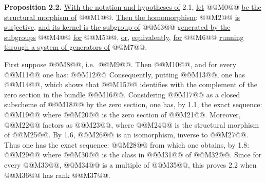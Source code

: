 
\textbf{Proposition 2.2.} \uline{With the notation and hypotheses of} 2.1, \uline{let} @@M0@@ \uline{be the structural morphism of} @@M1@@. \uline{Then the homomorphism}:
@@M2@@
\uline{is surjective}, \uline{and its kernel is the subgroup of} @@M3@@ \uline{generated by the subgroups} @@M4@@ \uline{for} @@M5@@, \uline{or}, \uline{equivalently}, \uline{for} @@M6@@ \uline{running through a system of generators of} @@M7@@.

First suppose @@M8@@, i.e.\ @@M9@@. Then @@M10@@, and for every @@M11@@ one has:
@@M12@@
Consequently, putting @@M13@@, one has @@M14@@, which shows that @@M15@@ identifies with the complement of the zero section in the bundle @@M16@@. Considering @@M17@@ as a closed subscheme of @@M18@@ by the zero section, one has, by 1.1, the exact sequence:
@@M19@@
where @@M20@@ is the zero section of @@M21@@. Moreover, @@M22@@ factors as @@M23@@, where @@M24@@ is the structural morphism of @@M25@@. By 1.6, @@M26@@ is an isomorphism, inverse to @@M27@@. Thus one has the exact sequence:
@@M28@@
from which one obtains, by 1.8:
@@M29@@
where @@M30@@ is the class in @@M31@@ of @@M32@@. Since for every @@M33@@, @@M34@@ is a multiple of @@M35@@, this proves 2.2 when @@M36@@ has rank @@M37@@.

